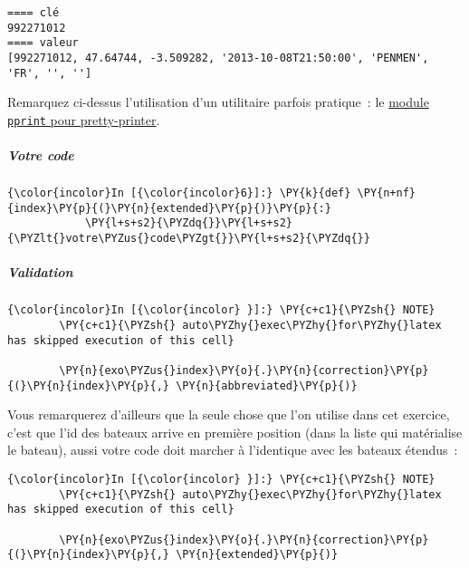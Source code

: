     \begin{Verbatim}[commandchars=\\\{\}]
==== clé
992271012
==== valeur
[992271012, 47.64744, -3.509282, '2013-10-08T21:50:00', 'PENMEN', 'FR', '', '']

    \end{Verbatim}

    Remarquez ci-dessus l'utilisation d'un utilitaire parfois pratique~: le
\href{https://docs.python.org/3/library/pprint.html}{module
\texttt{pprint} pour pretty-printer}.

    \hypertarget{votre-code}{%
\subparagraph{Votre code}\label{votre-code}}

    \begin{Verbatim}[commandchars=\\\{\}]
{\color{incolor}In [{\color{incolor}6}]:} \PY{k}{def} \PY{n+nf}{index}\PY{p}{(}\PY{n}{extended}\PY{p}{)}\PY{p}{:}
            \PY{l+s+s2}{\PYZdq{}}\PY{l+s+s2}{\PYZlt{}votre\PYZus{}code\PYZgt{}}\PY{l+s+s2}{\PYZdq{}}
\end{Verbatim}


    \hypertarget{validation}{%
\subparagraph{Validation}\label{validation}}

    \begin{Verbatim}[commandchars=\\\{\}]
{\color{incolor}In [{\color{incolor} }]:} \PY{c+c1}{\PYZsh{} NOTE}
        \PY{c+c1}{\PYZsh{} auto\PYZhy{}exec\PYZhy{}for\PYZhy{}latex has skipped execution of this cell}
        
        \PY{n}{exo\PYZus{}index}\PY{o}{.}\PY{n}{correction}\PY{p}{(}\PY{n}{index}\PY{p}{,} \PY{n}{abbreviated}\PY{p}{)}
\end{Verbatim}


    Vous remarquerez d'ailleurs que la seule chose que l'on utilise dans cet
exercice, c'est que l'id des bateaux arrive en première position (dans
la liste qui matérialise le bateau), aussi votre code doit marcher à
l'identique avec les bateaux étendus~:

    \begin{Verbatim}[commandchars=\\\{\}]
{\color{incolor}In [{\color{incolor} }]:} \PY{c+c1}{\PYZsh{} NOTE}
        \PY{c+c1}{\PYZsh{} auto\PYZhy{}exec\PYZhy{}for\PYZhy{}latex has skipped execution of this cell}
        
        \PY{n}{exo\PYZus{}index}\PY{o}{.}\PY{n}{correction}\PY{p}{(}\PY{n}{index}\PY{p}{,} \PY{n}{extended}\PY{p}{)}
\end{Verbatim}


